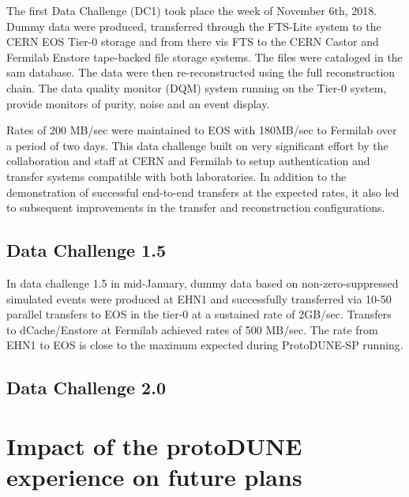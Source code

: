 The first Data Challenge (DC1) took place the week of November 6th, 2018.  
Dummy data were produced, transferred through the FTS-Lite system to the CERN EOS Tier-0 storage and from there vis FTS to the CERN Castor and Fermilab Enstore tape-backed file storage systems. The files were cataloged in the sam database.  The data were then re-reconstructed using the full reconstruction chain.
The data quality monitor (DQM) system running on the Tier-0 system, provide monitors of purity, noise and an event display. 


Rates of 200 MB/sec were maintained to EOS with 180MB/sec to Fermilab over a period of two days. 
This data challenge built on very significant effort by the collaboration and staff at CERN and Fermilab to setup authentication and transfer systems compatible with both laboratories.  In addition to the demonstration of successful end-to-end transfers at the expected rates, it also led to subsequent improvements in the transfer and reconstruction configurations. 

\subsection{Data Challenge 1.5}

In data challenge 1.5 in mid-January, dummy data based on non-zero-suppressed simulated events were produced at EHN1 and successfully transferred via 10-50 parallel transfers to EOS in the tier-0 at a sustained rate of 2GB/sec.    Transfers to dCache/Enstore at Fermilab achieved rates of 500 MB/sec.  
The rate from EHN1 to EOS is close to the maximum expected during ProtoDUNE-SP running. 









\subsection{Data Challenge 2.0}


\section{Impact of the protoDUNE experience on future plans}
